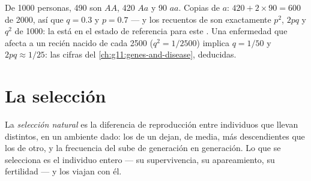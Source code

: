 \begin{example}\label{ex:g12:selection-drift-speciation:count}
De 1000 personas, 490 son $AA$, 420 $Aa$ y 90 $aa$. Copias de $a$:
$420 + 2 \times 90 = 600$ de 2000, así que $q = 0.3$ y $p = 0.7$ --- y
los recuentos de  son exactamente $p^2$, $2pq$ y $q^2$ de
1000: la  está en el estado de referencia para este . Una
enfermedad  que afecta a un recién nacido de cada 2500
($q^2 = 1/2500$) implica $q = 1/50$ y  $2pq \approx 1/25$:
las cifras del \cref{ch:g11:genes-and-disease}, deducidas.
\end{example}

\section{La selección}

\begin{definition}\label{def:g12:selection-drift-speciation:selection}
La \emph{selección natural} es la diferencia
de reproducción entre individuos que llevan  distintos, en un
ambiente dado: los  de un  dejan, de media, más
descendientes que los de otro, y la frecuencia del  sube de
generación en generación. Lo que se selecciona es el individuo entero
--- su supervivencia, su apareamiento, su fertilidad --- y los 
viajan con él.
\end{definition}


